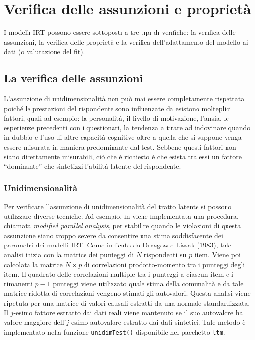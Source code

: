 \chapter{Verifica delle assunzioni e proprietà}
\label{chapter:goodness_of_fit_irt} 



I modelli IRT possono essere sottoposti a tre tipi di verifiche: la verifica delle assunzioni, la verifica delle proprietà e la verifica dell'adattamento del modello ai dati (o valutazione del fit).

\section{La verifica delle assunzioni}

L'assunzione di unidimensionalità non può mai essere completamente rispettata poiché le prestazioni del rispondente sono influenzate da
esistono molteplici fattori, quali ad esempio: la personalità, il livello di motivazione, l'ansia, le esperienze precedenti con i questionari, la tendenza a tirare ad indovinare quando in dubbio e l'uso di altre capacità cognitive oltre a quella che si suppone venga essere misurata in maniera predominante dal test. Sebbene questi fattori non siano direttamente misurabili, ciò che è richiesto è che esista tra essi un fattore ``dominante'' che sintetizzi l'abilità latente del rispondente.

\subsection{Unidimensionalità}

Per verificare l'assunzione di unidimensionalità del tratto latente si possono utilizzare diverse tecniche. Ad esempio, in \R\; viene implementata una procedura, chiamata {\it modified parallel analysis}, per stabilire quando le violazioni di questa assunzione siano troppo severe da consentire una stima soddisfacente dei parametri dei modelli IRT. Come indicato da Drasgow e Lissak  (1983), tale analisi inizia con la matrice dei punteggi di $N$ rispondenti su $p$ item. Viene poi calcolata la matrice $N \times p$ di correlazioni prodotto-momento tra i punteggi degli item. Il quadrato delle correlazioni multiple tra i punteggi a ciascun item e i rimanenti $p - 1$ punteggi viene utilizzato quale stima della comunalità e da tale matrice ridotta di correlazioni vengono stimati gli autovalori. Questa analisi viene ripetuta per una matrice di valori causali estratti da una normale standardizzata.  Il $j$-esimo fattore  estratto dai dati reali viene mantenuto se il suo autovalore ha valore maggiore dell'$j$-esimo autovalore estratto dai dati sintetici. Tale metodo è implementato nella funzione {\tt unidimTest()} disponibile nel pacchetto {\tt ltm}.

